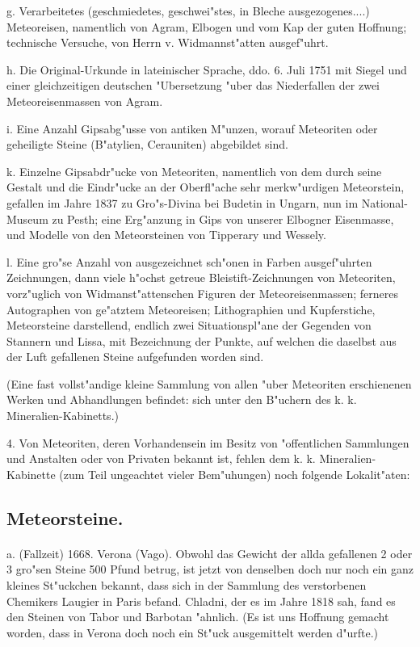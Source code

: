 \documentclass[a4paper, 11pt, oneside, polutonikogreek, german]{article}
\begin{document}
g. Verarbeitetes (geschmiedetes, geschwei"stes, in Bleche ausgezogenes....) Meteoreisen, namentlich von Agram, Elbogen und vom Kap der guten Hoffnung; technische Versuche, von Herrn v. Widmannst"atten ausgef"uhrt.

h. Die Original-Urkunde in lateinischer Sprache, ddo. 6. Juli 1751 mit Siegel und einer gleichzeitigen deutschen "Ubersetzung "uber das Niederfallen der zwei Meteoreisenmassen von Agram.

i. Eine Anzahl Gipsabg"usse von antiken M"unzen, worauf Meteoriten oder geheiligte Steine (B"atylien, Cerauniten) abgebildet sind.

k. Einzelne Gipsabdr"ucke von Meteoriten, namentlich von dem durch seine Gestalt und die Eindr"ucke an der Oberfl"ache sehr merkw"urdigen Meteorstein, gefallen im Jahre 1837 zu Gro"s-Divina bei Budetin in Ungarn, nun im National-Museum zu Pesth; eine Erg"anzung in Gips von unserer Elbogner Eisenmasse, und Modelle von den Meteorsteinen von Tipperary und Wessely.

l. Eine gro"se Anzahl von ausgezeichnet sch"onen in Farben ausgef"uhrten Zeichnungen, dann viele h"ochst getreue Bleistift-Zeichnungen von Meteoriten, vorz"uglich von Widmanst"attenschen Figuren der Meteoreisenmassen; ferneres Autographen von ge"atztem Meteoreisen; Lithographien und Kupferstiche, Meteorsteine darstellend, endlich zwei Situationspl"ane der Gegenden von Stannern und Lissa, mit Bezeichnung der Punkte, auf welchen die daselbst aus der Luft gefallenen Steine aufgefunden worden sind.

(Eine fast vollst"andige kleine Sammlung von allen "uber Meteoriten erschienenen Werken und Abhandlungen befindet: sich unter den B"uchern des k. k. Mineralien-Kabinetts.)

4. Von Meteoriten, deren Vorhandensein im Besitz von "offentlichen Sammlungen und Anstalten oder von Privaten bekannt ist, fehlen dem k. k. Mineralien-Kabinette (zum Teil ungeachtet vieler Bem"uhungen) noch folgende Lokalit"aten:
\subsection{Meteorsteine.}
\paragraph{}
a. (Fallzeit) 1668. Verona (Vago). Obwohl das Gewicht der allda gefallenen 2 oder 3 gro"sen Steine 500 Pfund betrug, ist jetzt von denselben doch nur noch ein ganz kleines St"uckchen bekannt, dass sich in der Sammlung des verstorbenen Chemikers Laugier in Paris befand. Chladni, der es im Jahre 1818 sah, fand es den Steinen von Tabor und Barbotan "ahnlich. (Es ist uns Hoffnung gemacht worden, dass in Verona doch noch ein St"uck ausgemittelt werden d"urfte.)
\end{document}
